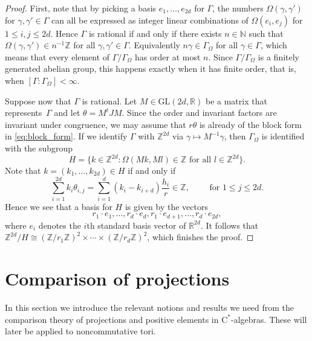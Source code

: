 \documentclass[reqno, a4paper]{amsart}
\numberwithin{equation}{section}
\newcommand{\N}{\mathbb{N}}   %
\newcommand{\Z}{\mathbb{Z}}   %
\newcommand{\R}{\mathbb{R}}   %
\newcommand{\ca}{$\mathrm{C}^*$-algebra}
\def\subgroup#1{{#1}_\Omega}
\begin{document}
\begin{proof}
First, note that by picking a basis $e_1, \ldots, e_{2d}$ for $\Gamma$, the numbers $\Omega(\gamma,\gamma')$ for $\gamma,\gamma' \in \Gamma$ can all be expressed as integer linear combinations of $\Omega(e_i,e_j)$ for $1 \leq i,j \leq 2d$. Hence $\Gamma$ is rational if and only if there exists $n \in \N$ such that $\Omega(\gamma,\gamma') \in n^{-1}\Z$ for all $\gamma,\gamma' \in \Gamma$. Equivalently $n \gamma \in \subgroup{\Gamma}$ for all $\gamma \in \Gamma$, which means that every element of $\Gamma / \subgroup{\Gamma}$ has order at most $n$. Since $\Gamma / \subgroup{\Gamma}$ is a finitely generated abelian group, this happens exactly when it has finite order, that is, when $[\Gamma : \subgroup{\Gamma} ] < \infty$.

Suppose now that $\Gamma$ is rational. Let $M \in \mathrm{GL}(2d,\R)$ be a matrix that represents~$\Gamma$ and let $\theta = M^t J M$. Since the order and invariant factors are invariant under congruence, we may assume that $r\theta$ is already of the block form in \eqref{eq:block_form}. 
If we identify $\Gamma$ with $\Z^{2d}$ via $\gamma \mapsto M^{-1}\gamma$, then $\Gamma_{\Omega}$ is identified with the subgroup
\[ 
H = \big\{ k \in \Z^{2d} : \Omega(Mk,Ml) \in \Z \text{ for all } l \in \Z^{2d} \big\}.
\]
Note that $k = (k_1, \ldots, k_{2d}) \in H$ if and only if
\[ 
\sum_{i=1}^{2d} k_i \theta_{i,j} = \sum_{i=1}^d (k_i - k_{i+d}) \frac{h_i}{r} \in \Z, 
\qquad \text{ for } 1 \leq j \leq 2d. 
\]
Hence we see that a basis for $H$ is given by the vectors
\[ 
r_1 \cdot e_1, \ldots, r_d \cdot e_d, r_1 \cdot e_{d+1}, \ldots, r_d \cdot e_{2d}, 
\]
where $e_i$ denotes the $i$th standard basis vector of $\R^{2d}$. It follows that $\Z^{2d}/H \cong (\Z / r_1 \Z)^2 \times \cdots \times (\Z / r_d \Z)^2$, which finishes the proof.
\end{proof}


\section{Comparison of projections}

In this section we introduce the relevant notions and results we need from the comparison theory of projections and positive elements in \ca{s}.
These will later be applied to noncommutative tori.
\end{document}
